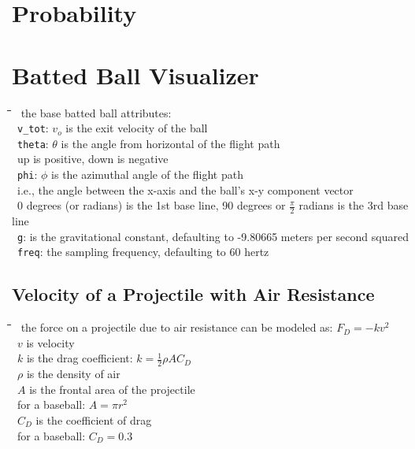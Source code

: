 \documentclass[10pt,letterpaper]{scrartcl}
\newcommand{\tbul}{\textbullet}
\newcommand{\tend}{\>\textendash}
\newcommand{\tasc}{\>\>\textasteriskcentered}
\newcommand{\tabDef}{\hspace{2em}\=\hspace{2em}\=\hspace{2em}\=\hspace{2em}\=\kill}
\begin{document}
\newpage\section{Probability}

\newpage\section{Batted Ball Visualizer}\begin{tabbing}\tabDef
\tbul\ the base batted ball attributes: \\
    \tend\ \texttt{v\_tot}: $v_o$ is the exit velocity of the ball \\
    \tend\ \texttt{theta}: $\theta$ is the angle from horizontal of the flight path \\
        \tasc\ up is positive, down is negative \\
    \tend\ \texttt{phi}: $\phi$ is the azimuthal angle of the flight path \\
        \tasc\ i.e., the angle between the x-axis and the ball's x-y component vector \\
        \tasc\ 0 degrees (or radians) is the 1st base line, 90 degrees or $\frac{\pi}{2}$ radians is the 3rd base line\\
    \tend\ \texttt{g}: is the gravitational constant, defaulting to -9.80665 meters per second squared \\
    \tend\ \texttt{freq}: the sampling frequency, defaulting to 60 hertz\end{tabbing}
\subsection{Velocity of a Projectile with Air Resistance}\begin{tabbing}\tabDef
\tbul\ the force on a projectile due to air resistance can be modeled as: $F_D = -kv^2$ \\
    \tend\ $v$ is velocity \\
    \tend\ $k$ is the drag coefficient: $k = \frac{1}{2}\rho A C_D$\\
    \tend\ $\rho$ is the density of air \\
    \tend\ $A$ is the frontal area of the projectile \\
        \tasc\ for a baseball: $A = \pi r^2$ \\
    \tend\ $C_D$ is the coefficient of drag \\
        \tasc\ for a baseball: $C_D = 0.3$\end{tabbing}
\end{document}

